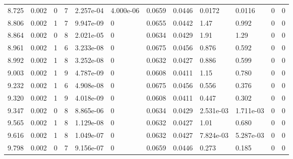 \documentclass[preview]{standalone}
\begin{document}
{{{\begin{tabular}{L{1.2cm}C{1.2cm} C{0.3cm}C{0.5cm} C{1.4cm}C{1.4cm} C{1.4cm}C{1.4cm} C{1.6cm}C{1.6cm} C{1.6cm}C{1.6cm}}
  8.725  &  0.002  & 0     &  7 &  2.257e-04  & 4.000e-06  &  0.0659&   0.0446& 0.0172 & 0.0116   &  0 & 0  \\ 
  8.806  &  0.002  & 1     &  7 &  9.947e-09  & 0  &  0.0655&   0.0442& 1.47 & 0.992   &  0 & 0  \\ 
  8.864  &  0.002  & 0     &  8 &  2.021e-05  & 0  &  0.0634&   0.0429& 1.91 & 1.29   &  0 & 0  \\ 
  8.961  &  0.002  & 1     &  6 &  3.233e-08  & 0  &  0.0675&   0.0456& 0.876 & 0.592   &  0 & 0  \\ 
  8.992  &  0.002  & 1     &  8 &  3.252e-08  & 0  &  0.0632&   0.0427& 0.886 & 0.599   &  0 & 0  \\ 
  9.003  &  0.002  & 1     &  9 &  4.787e-09  & 0  &  0.0608&   0.0411& 1.15 & 0.780   &  0 & 0  \\ 
  9.232  &  0.002  & 1     &  6 &  4.908e-08  & 0  &  0.0675&   0.0456& 0.556 & 0.376   &  0 & 0  \\ 
  9.320  &  0.002  & 1     &  9 &  4.018e-09  & 0  &  0.0608&   0.0411& 0.447 & 0.302   &  0 & 0  \\ 
  9.347  &  0.002  & 0     &  8 &  8.865e-06  & 0  &  0.0634&   0.0429& 2.531e-03 & 1.711e-03   &  0 & 0  \\ 
  9.565  &  0.002  & 1     &  8 &  1.129e-08  & 0  &  0.0632&   0.0427& 1.01 & 0.680   &  0 & 0  \\ 
  9.616  &  0.002  & 1     &  8 &  1.049e-07  & 0  &  0.0632&   0.0427& 7.824e-03 & 5.287e-03   &  0 & 0  \\ 
  9.798  &  0.002  & 0     &  7 &  9.156e-07  & 0  &  0.0659&   0.0446& 0.273 & 0.185   &  0 & 0  \\ 
\hline 
\end{tabular} 

}}}
\end{document}
